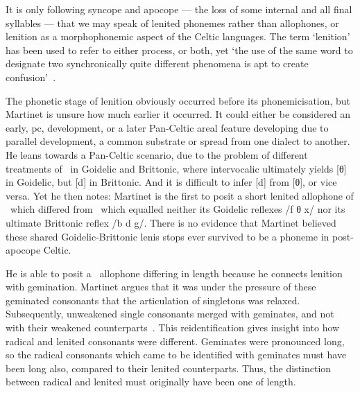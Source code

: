 It is only following syncope and apocope — the loss of some internal and all final syllables — that we may speak of lenited phonemes rather than allophones, or lenition as a morphophonemic aspect of the Celtic languages. The term `lenition' has been used to refer to either process, or both, yet `the use of the same word to designate two synchronically quite different phenomena is apt to create confusion'~\autocite[193–194]{martinet_celtic_1952}.

The phonetic stage of lenition obviously occurred before its phonemicisation, but Martinet is unsure how much earlier it occurred. It could either be considered an early, \gls{pc}, development, or a later Pan-Celtic areal feature developing due to parallel development, a common substrate or spread from one dialect to another. He leans towards a Pan-Celtic scenario, due to the problem of different treatments of \lT\ in Goidelic and Brittonic, where intervocalic  ultimately yields [θ] in Goidelic, but [d] in Brittonic. And it is difficult to infer [d] from [θ], or vice versa. Yet he then notes:
Martinet is the first to posit a short lenited allophone of \lT\ which differed from \xD\, which equalled neither its Goidelic reflexes /f θ x/ nor its ultimate Brittonic reflex /b d g/. There is no evidence that Martinet believed these shared Goidelic-Brittonic lenis stops ever survived to be a phoneme in post-apocope Celtic.

He is able to posit a \lT\ allophone differing in length because he connects lenition with gemination. Martinet argues that it was under the pressure of these geminated consonants  that the articulation of singletons was relaxed. Subsequently, unweakened single consonants merged with geminates, and not with their weakened counterparts~\autocite[212]{martinet_celtic_1952}. This reidentification gives insight into how radical and lenited consonants were different. Geminates were pronounced long, so the radical consonants which came to be identified with geminates must have been long also, compared to their lenited counterparts. Thus, the distinction between radical and lenited must originally have been one of length.


